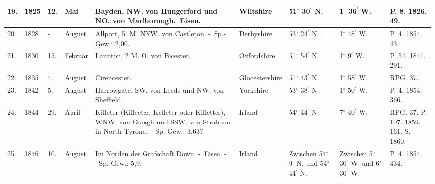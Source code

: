 \documentclass[a4paper, 8pt, oneside, polutonikogreek, german]{article}
\begin{document}
\begin{center}
\begin{longtable}{|p{3mm}|p{7mm}|p{3mm}|p{11mm}|p{30mm}|p{20mm}|p{11mm}|p{11mm}|p{11mm}|}
        19. & 1825 & 12. & Mai & Bayden, NW. von Hungerford und NO. von Marlborough. Eisen. & Wiltshire & 51$^\circ$ 30$^\prime$ N. & 1$^\circ$ 36$^\prime$ W. & P. 8. 1826. 49. \\ \hline
        20. & 1828 & - & August & Allport, 5. M. NNW. von Castleton. - Sp.-Gew.: 2,00. & Derbyshire & 53$^\circ$ 24$^\prime$ N. & 1$^\circ$ 48$^\prime$ W. & P. 4. 1854. 43. \\ \hline
        21. & 1830 & 15. & Februar & Launton, 2 M. O. von Bicester. & Oxfordshire & 51$^\circ$ 54$^\prime$ N. & 1$^\circ$ 9$^\prime$ W. & P. 54. 1841. 291. \\ \hline
        22. & 1835 & 4. & August & Cirencester. & Glocestershire & 51$^\circ$ 43$^\prime$ N. & 1$^\circ$ 58$^\prime$ W. & RPG. 37. \\ \hline
        23. & 1842 & 5. & August & Harrowgate, SW. von Leeds und NW. von Sheffield. & Yorkshire & 53$^\circ$ 38$^\prime$ N. & 1$^\circ$ 50$^\prime$ W. & P. 4. 1854. 366. \\ \hline
        24. & 1844 & 29. & April & Killeter (Killeeter, Kelleter oder Killetter), WNW. von Omagh und SSW. von Strabone in North-Tyrone. - Sp.-Gew.: 3,63? & Irland & 54$^\circ$ 44$^\prime$ N. & 7$^\circ$ 40$^\prime$ W. & RPG. 37. P. 107. 1859. 161. S. 1860. \\ \hline
        25. & 1846 & 10. & August & Im Norden der Grafschaft Down. - Eisen. - Sp.-Gew.: 5,9. & Irland & Zwischen 54$^\circ$ 0$^\prime$ N. und 54$^\circ$ 44$^\prime$ N. & Zwischen 5$^\circ$ 30$^\prime$ W. und 6$^\circ$ 30$^\prime$ W. & P. 4. 1854. 434. \\ \hline
    \end{longtable}
\end{center}
\end{document}

